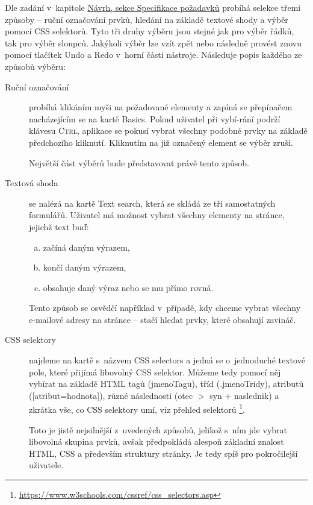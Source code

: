 \documentclass[thesis=B,czech]{FITthesis}[2012/06/26]
\begin{document}
Dle zadání v~kapitole \hyperref[sec:requirements_specification]{Návrh, sekce Specifikace požadavků} probíhá selekce třemi způsoby -- ruční označování prvků, hledání na základě textové shody a výběr pomocí CSS selektorů. Tyto tři druhy výběru jsou stejné jak pro výběr řádků, tak pro výběr sloupců. Jakýkoli výběr lze vzít zpět nebo následně provést znovu pomocí tlačítek \textsf{Undo} a \textsf{Redo} v~horní části nástroje. Následuje popis každého ze způsobů výběru:
\begin{description}
	\item[Ruční označování] probíhá klikáním myši na požadované elementy a zapíná se přepínačem nacházejícím se na kartě \textsf{Basics}. Pokud uživatel při vybí-rání podrží klávesu \textsc{Ctrl}, aplikace se pokusí vybrat všechny podobné prvky na základě předchozího kliknutí. Kliknutím na již označený element se výběr zruší.
	
	Největší část výběrů bude představovat právě tento způsob.
	
	\item [Textová shoda] se nalézá na kartě \textsf{Text search}, která se skládá ze tří samostatných formulářů. Uživatel má možnost vybrat všechny elementy na stránce, jejichž text buď:
	\begin{enumerate}[a)]
		\item začíná daným výrazem,
		\item končí daným výrazem,
		\item obsahuje daný výraz nebo se mu přímo rovná.
	\end{enumerate}
	Tento způsob se osvědčí například v~případě, kdy chceme vybrat všechny e-mailové adresy na stránce -- stačí hledat prvky, které obsahují zavináč.
	\item [CSS selektory] najdeme na kartě s~názvem \textsf{CSS selectors} a jedná se o~jednoduché textové pole, které přijímá libovolný CSS selektor. Můžeme tedy pomocí něj vybírat na základě HTML tagů (\textsf{jmenoTagu}), tříd (\textsf{.jmenoTridy}), atributů (\textsf{[atribut=hodnota]}), různé následnosti (\textsf{otec $>$ syn $+$ naslednik}) a zkrátka vše, co CSS selektory umí, viz přehled selektorů \footnote{\url{https://www.w3schools.com/cssref/css_selectors.asp}}.
	
	Toto je jistě nejsilnější z~uvedených způsobů, jelikož s~ním jde vybrat libovolná skupina prvků, avšak předpokládá alespoň základní znalost HTML, CSS a především struktury stránky. Je tedy spíš pro pokročilejší uživatele.
\end{description}
\end{document}
